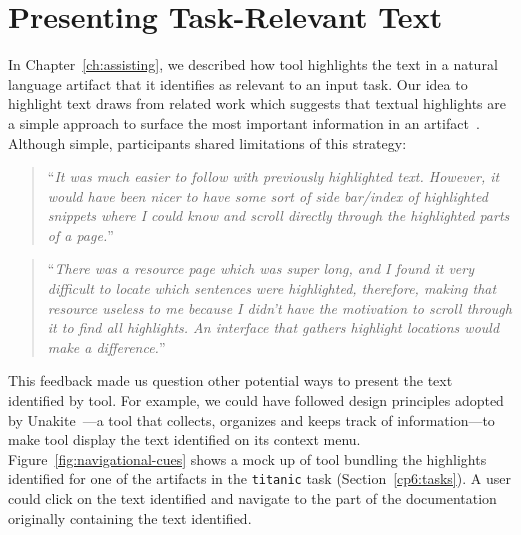 




\section{Presenting Task-Relevant Text}
\label{cp7:info-viz}




In Chapter~\ref{ch:assisting}, we described how \acs{tool}
highlights the text in a natural language artifact that it identifies 
as relevant to an input task. Our idea to highlight text 
draws from related work which suggests that textual highlights 
are a simple approach to surface the most important information in 
an artifact~\cite{Robillard2015,nadi2020}. 
Although simple, participants shared limitations of 
this strategy:



\smallskip
\begin{footnotesize}
\begin{quote}
``\textit{It was much easier to follow with previously highlighted text.  
    However, it would have been nicer to have some sort of side bar/index of highlighted snippets
    where I could know and scroll directly through the highlighted parts of a page.}''
\end{quote}
\end{footnotesize}



\smallskip
\begin{footnotesize}
\begin{quote}
``\textit{There was a resource page which was super long, and I found it very difficult to locate which sentences were highlighted, therefore, making that resource useless to me because I didn't have the motivation to scroll through it to find all highlights. An interface that gathers highlight locations would make a difference.}''
\end{quote}
\end{footnotesize}


\smallskip
This feedback made us question other potential ways to present the text identified by \acs{tool}.
For example, we could have followed design principles adopted by Unakite~\cite{Liu2018Unakite}---a tool that collects, organizes and keeps track of information---to make \acs{tool} display the text identified on its context menu.
Figure~\ref{fig:navigational-cues} shows a mock up of \acs{tool} bundling the highlights identified for one of the artifacts in the \texttt{titanic} task (Section~\ref{cp6:tasks}).
A user could click on the text identified and navigate to the part of the documentation 
originally containing the text identified.



